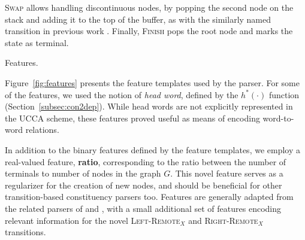 \documentclass[11pt]{article}
\makeatletter
\newcommand{\secref}[1]{Section~\ref{#1}}
\newcommand{\figref}[1]{Figure~\ref{#1}}
\renewcommand{\paragraph}{
  \@startsection{paragraph}{4}
  {\z@}{.5ex \@plus .5ex \@minus .2ex}{-1em}
  {\normalfont\normalsize\bfseries}
}
\makeatother
\begin{document}
\textsc{Swap} allows handling discontinuous nodes, by popping the second
node on the stack and adding it to the top of the buffer, as with the similarly
named transition in previous work \cite{nivre2009non,maier2015discontinuous}.
Finally, \textsc{Finish} pops the root node and marks the state as terminal.

\paragraph{Features.}
\label{subsec:features}

\figref{fig:features} presents the feature templates used by the parser.
For some of the features, we used the notion of \textit{head word},
defined by the $h^*(\cdot)$ function (\secref{subsec:con2dep}).
While head words are not explicitly represented in the UCCA scheme, these
features proved useful as means of encoding word-to-word relations.

In addition to the binary features defined by the feature templates,
we employ a real-valued feature, \textbf{ratio}, corresponding to the ratio between the number of terminals to number of nodes
in the graph $G$. This novel feature serves as a regularizer for the creation of new nodes, and should be beneficial for other transition-based constituency parsers too.
Features are generally adapted from the related parsers of  and
, with a small additional set of features encoding relevant information
for the novel \textsc{Left-Remote$_X$} and \textsc{Right-Remote$_X$} transitions.


\end{document}
